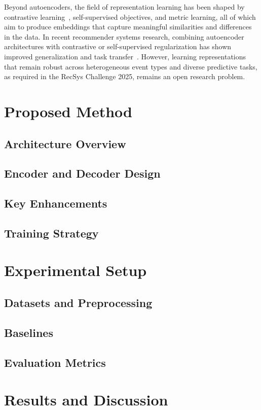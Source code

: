 \documentclass[sigconf]{acmart}
\begin{document}
Beyond autoencoders, the field of representation learning has been shaped by contrastive learning~\cite{Oord2018, Chen2020SimCLR}, self-supervised objectives, and metric learning, all of which aim to produce embeddings that capture meaningful similarities and differences in the data. In recent recommender systems research, combining autoencoder architectures with contrastive or self-supervised regularization has shown improved generalization and task transfer~\cite{Zhou2020S3Rec, Zhan2022CLAES}. However, learning representations that remain robust across heterogeneous event types and diverse predictive tasks, as required in the RecSys Challenge 2025, remains an open research problem.

\section{Proposed Method}
\label{sec:method}
\subsection{Architecture Overview}
\subsection{Encoder and Decoder Design}
\subsection{Key Enhancements}
\subsection{Training Strategy}

\section{Experimental Setup}
\label{sec:experiments}
\subsection{Datasets and Preprocessing}
\subsection{Baselines}
\subsection{Evaluation Metrics}

\section{Results and Discussion}
\end{document}

